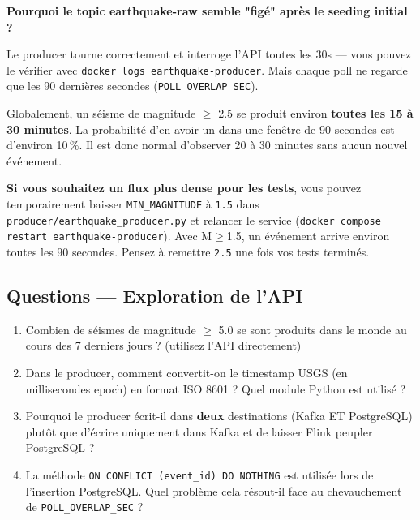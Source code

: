 \documentclass[12pt,a4paper]{article}
\begin{document}
\begin{warningbox}
  \textbf{Pourquoi le topic earthquake-raw semble "figé" après le seeding initial ?}

  Le producer tourne correctement et interroge l'API toutes les 30s ---
  vous pouvez le vérifier avec \texttt{docker logs earthquake-producer}.
  Mais chaque poll ne regarde que les 90 dernières secondes (\texttt{POLL\_OVERLAP\_SEC}).

  \medskip
  Globalement, un séisme de magnitude $\geq$ 2.5 se produit environ
  \textbf{toutes les 15 à 30 minutes}. La probabilité d'en avoir un
  dans une fenêtre de 90 secondes est d'environ 10\,\%.
  Il est donc normal d'observer 20 à 30 minutes sans aucun nouvel événement.

  \medskip
  \textbf{Si vous souhaitez un flux plus dense pour les tests}, vous pouvez
  temporairement baisser \texttt{MIN\_MAGNITUDE} à \texttt{1.5} dans
  \texttt{producer/earthquake\_producer.py} et relancer le service
  (\texttt{docker compose restart earthquake-producer}).
  Avec M$\geq$1.5, un événement arrive environ toutes les 90 secondes.
  Pensez à remettre \texttt{2.5} une fois vos tests terminés.
\end{warningbox}

\subsection*{Questions --- Exploration de l'API}

\begin{enumerate}[label=\textbf{Q\arabic*.}]
  \item Combien de séismes de magnitude $\geq$ 5.0 se sont produits dans le monde
        au cours des 7 derniers jours ? (utilisez l'API directement)
  \item Dans le producer, comment convertit-on le timestamp USGS (en millisecondes epoch)
        en format ISO 8601 ? Quel module Python est utilisé ?
  \item Pourquoi le producer écrit-il dans \textbf{deux} destinations (Kafka ET PostgreSQL)
        plutôt que d'écrire uniquement dans Kafka et de laisser Flink peupler PostgreSQL ?
  \item La méthode \texttt{ON CONFLICT (event\_id) DO NOTHING} est utilisée lors
        de l'insertion PostgreSQL. Quel problème cela résout-il face au chevauchement
        de \texttt{POLL\_OVERLAP\_SEC} ?
\end{enumerate}

\newpage
\end{document}

